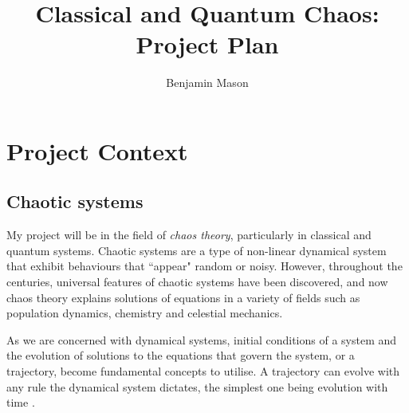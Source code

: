 \documentclass[12pt,a4paper]{amsart}
\title{Classical and Quantum Chaos: Project Plan}
\author{Benjamin Mason}
\begin{document}
\maketitle









\section{Project Context}

\subsection{Chaotic systems}
My project will be in the field of \textit{chaos theory}, particularly in classical and quantum systems. Chaotic systems are a type of non-linear dynamical system that exhibit behaviours that ``appear" random or noisy. However, throughout the centuries, universal features of chaotic systems have been discovered, and now chaos theory explains solutions of equations in a variety of fields such as population dynamics, chemistry and celestial mechanics.

As we are concerned with dynamical systems, initial conditions of a system and the evolution of solutions to the equations that govern the system, or a trajectory, become fundamental concepts to utilise. A trajectory can evolve with any rule the dynamical system dictates, the simplest one being evolution with time \cite{HILBORN}.
\end{document}
